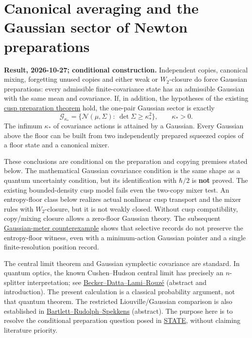 \documentclass[11pt,a4paper]{article}
\begin{document}
\hypertarget{canonical-averaging-and-the-gaussian-sector-of-newton-preparations}{%
\section{Canonical averaging and the Gaussian sector of Newton
preparations}\label{canonical-averaging-and-the-gaussian-sector-of-newton-preparations}}

\textbf{Result, 2026-10-27; conditional construction.} Independent
copies, canonical mixing, forgetting unused copies and either weak or
\(W_2\)-closure do force Gaussian preparations: every admissible
finite-covariance state has an admissible Gaussian with the same mean
and covariance. If, in addition, the hypotheses of the existing
\href{newton-cusp-preparation-floor.md}{cusp preparation theorem} hold,
the one-pair Gaussian sector is exactly \[
 \mathcal G_{\kappa_*}
 =\{\mathcal N(\mu,\Sigma):\ \det\Sigma\ge\kappa_*^2\},
 \qquad \kappa_*>0. \tag{1}
\] The infimum \(\kappa_*\) of covariance actions is attained by a
Gaussian. Every Gaussian above the floor can be built from two
independently prepared squeezed copies of a floor state and a canonical
mixer.

These conclusions are conditional on the preparation and copying
premises stated below. The mathematical Gaussian covariance condition is
the same shape as a quantum uncertainty condition, but its
identification with \(\hbar/2\) is \textbf{not} proved. The existing
bounded-density cusp model fails even the two-copy mixer test. An
entropy-floor class below realizes actual nonlinear cusp transport and
the mixer rules with \(W_2\)-closure, but it is not weakly closed.
Without cusp compatibility, copy/mixing closure allows a zero-floor
Gaussian theory. The subsequent
\href{gaussian-meter-entropy-floor.md}{Gaussian-meter counterexample}
shows that selective records do not preserve the entropy-floor witness,
even with a minimum-action Gaussian pointer and a single
finite-resolution position record.

The central limit theorem and Gaussian symplectic covariance are
standard. In quantum optics, the known Cushen--Hudson central limit has
precisely an \(n\)-splitter interpretation; see
\href{https://arxiv.org/abs/1912.06129}{Becker--Datta--Lami--Rouzé}
(abstract and introduction). The present calculation is a classical
probability argument, not that quantum theorem. The restricted
Liouville/Gaussian comparison is also established in
\href{https://arxiv.org/abs/1111.5057}{Bartlett--Rudolph--Spekkens}
(abstract). The purpose here is to resolve the conditional preparation
question posed in \href{../research/STATE.md}{STATE}, without claiming
literature priority.
\end{document}
